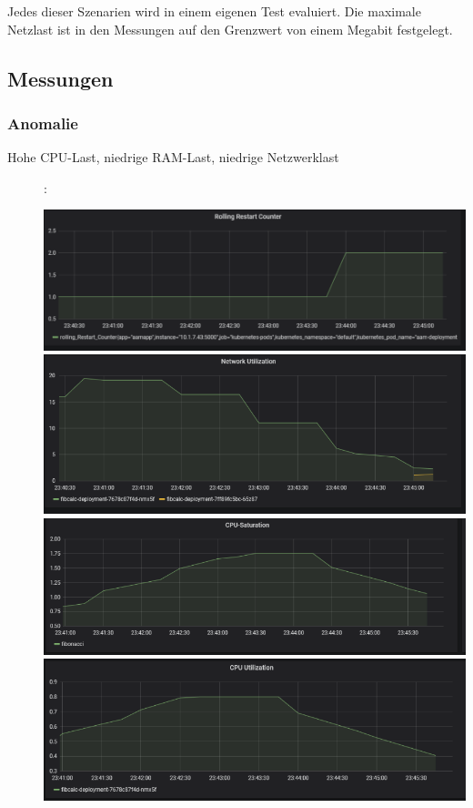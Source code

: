 \documentclass[a4paper,10pt]{scrartcl}
\begin{document}
Jedes dieser Szenarien wird in einem eigenen Test evaluiert.
Die maximale Netzlast ist in den Messungen auf den Grenzwert von einem Megabit festgelegt.

\pagebreak
\subsection{Messungen}

\subsubsection{Anomalie}

\begin{description}
\item[Hohe CPU-Last, niedrige RAM-Last, niedrige Netzwerklast]:\\

\begin{minipage}{\linewidth}

            \includegraphics[width=1.3\textwidth]{img/CPUAnomalie/RollingRestart.PNG}
            \includegraphics[width=.5\textwidth]{img/CPUAnomalie/Netzwerk.PNG}
            \includegraphics[scale=1,width=.8\textwidth,height=.14\textheight]{img/CPUAnomalie/Saturation.PNG}
  			\includegraphics[scale=1,width=.8\textwidth]{img/CPUAnomalie/Utilization.PNG}
\end{minipage}


\end{description}
\end{document}
